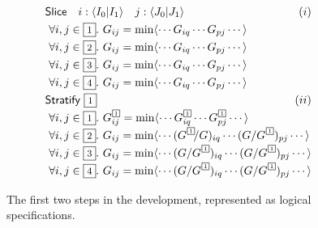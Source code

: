 \begin{figure}
\[\renewcommand\arraystretch{1.3}
  \begin{array}{@{}l@{}}
    \textsf{Slice} \quad i:\langle I_0|I_1\rangle \quad j:\langle J_0|J_1\rangle \hfill (i)\\
    ~\forall i,j\in\qbox1.~ G_{ij} = \min \langle\cdots G_{iq} \cdots G_{pj} \cdots \rangle \\
    ~\forall i,j\in\qbox2.~ G_{ij} = \min \langle\cdots G_{iq} \cdots G_{pj} \cdots \rangle \\
    ~\forall i,j\in\qbox3.~ G_{ij} = \min \langle\cdots G_{iq} \cdots G_{pj} \cdots \rangle \\
    ~\forall i,j\in\qbox4.~ G_{ij} = \min \langle\cdots G_{iq} \cdots G_{pj} \cdots \rangle \\
    \textsf{Stratify} ~ \qbox1 \hfill (ii)\\
    ~\forall i,j\in\qbox1.~ G^{\tinyqbox1}_{ij} = \min \langle\cdots G^{\tinyqbox1}_{iq} \cdots G^{\tinyqbox1}_{pj} \cdots \rangle \\
    ~\forall i,j\in\qbox2.~ G_{ij} = \min \langle\cdots (G^{\tinyqbox1}\!/G)_{iq} \cdots (G/G^{\tinyqbox1})_{pj} \cdots \rangle \\
    ~\forall i,j\in\qbox3.~ G_{ij} = \min \langle\cdots (G/G^{\tinyqbox1})_{iq} \cdots (G/G^{\tinyqbox1})_{pj} \cdots \rangle \\
    ~\forall i,j\in\qbox4.~ G_{ij} = \min \langle\cdots (G/G^{\tinyqbox1})_{iq} \cdots (G/G^{\tinyqbox1})_{pj} \cdots \rangle
  \end{array}
\]
\caption{\label{overview:logical-slice-stratify}
  The first two steps in the development, represented as logical specifications.}
\end{figure}


